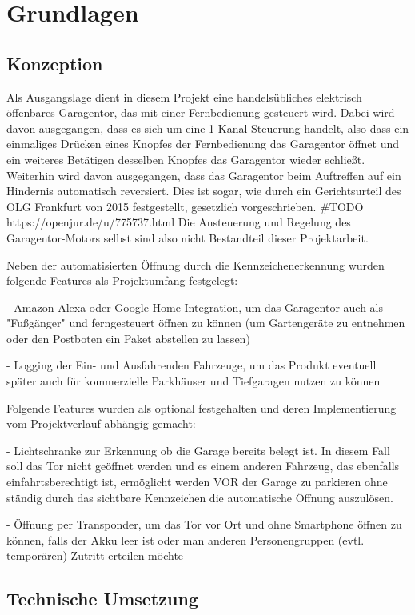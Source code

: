 \chapter{Grundlagen}
\section{Konzeption}
Als Ausgangslage dient in diesem Projekt eine handelsübliches elektrisch öffenbares Garagentor, das mit einer Fernbedienung gesteuert wird. Dabei wird davon ausgegangen, dass es sich um eine 1-Kanal Steuerung handelt, also dass ein einmaliges Drücken eines Knopfes der Fernbedienung das Garagentor öffnet und ein weiteres Betätigen desselben Knopfes das Garagentor wieder schließt. Weiterhin wird davon ausgegangen, dass das Garagentor beim Auftreffen auf ein Hindernis automatisch reversiert. Dies ist sogar, wie durch ein Gerichtsurteil des OLG Frankfurt von 2015 festgestellt, gesetzlich vorgeschrieben. #TODO https://openjur.de/u/775737.html
Die Ansteuerung und Regelung des Garagentor-Motors selbst sind also nicht Bestandteil dieser Projektarbeit.

Neben der automatisierten Öffnung durch die Kennzeichenerkennung wurden folgende Features als Projektumfang festgelegt:

- Amazon Alexa oder Google Home Integration, um das Garagentor auch als "Fußgänger" und ferngesteuert öffnen zu können (um Gartengeräte zu entnehmen oder den Postboten ein Paket abstellen zu lassen)

- Logging der Ein- und Ausfahrenden Fahrzeuge, um das Produkt eventuell später auch für kommerzielle Parkhäuser und Tiefgaragen nutzen zu können

Folgende Features wurden als optional festgehalten und deren Implementierung vom Projektverlauf abhängig gemacht:

- Lichtschranke zur Erkennung ob die Garage bereits belegt ist. In diesem Fall soll das Tor nicht geöffnet werden und es einem anderen Fahrzeug, das ebenfalls einfahrtsberechtigt ist, ermöglicht werden VOR der Garage zu parkieren ohne ständig durch das sichtbare Kennzeichen die automatische Öffnung auszulösen.

- Öffnung per Transponder, um das Tor vor Ort und ohne Smartphone öffnen zu können, falls der Akku leer ist oder man anderen Personengruppen (evtl. temporären) Zutritt erteilen möchte

\section{Technische Umsetzung}

